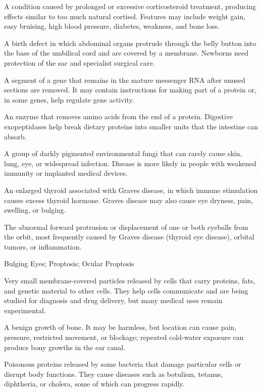  A condition caused by prolonged or excessive corticosteroid treatment, producing effects similar to too much natural cortisol. Features may include weight gain, easy bruising, high blood pressure, diabetes, weakness, and bone loss.

 A birth defect in which abdominal organs protrude through the belly button into the base of the umbilical cord and are covered by a membrane. Newborns need protection of the sac and specialist surgical care.

 A segment of a gene that remains in the mature messenger RNA after unused sections are removed. It may contain instructions for making part of a protein or, in some genes, help regulate gene activity.

 An enzyme that removes amino acids from the end of a protein. Digestive exopeptidases help break dietary proteins into smaller units that the intestine can absorb.

 A group of darkly pigmented environmental fungi that can rarely cause skin, lung, eye, or widespread infection. Disease is more likely in people with weakened immunity or implanted medical devices.

 An enlarged thyroid associated with Graves disease, in which immune stimulation causes excess thyroid hormone. Graves disease may also cause eye dryness, pain, swelling, or bulging.

 The abnormal forward protrusion or displacement of one or both eyeballs from the orbit, most frequently caused by Graves disease (thyroid eye disease), orbital tumors, or inflammation.

\synonyms
Bulging Eyes; Proptosis; Ocular Proptosis

 Very small membrane-covered particles released by cells that carry proteins, fats, and genetic material to other cells. They help cells communicate and are being studied for diagnosis and drug delivery, but many medical uses remain experimental.

 A benign growth of bone. It may be harmless, but location can cause pain, pressure, restricted movement, or blockage; repeated cold-water exposure can produce bony growths in the ear canal.

 Poisonous proteins released by some bacteria that damage particular cells or disrupt body functions. They cause diseases such as botulism, tetanus, diphtheria, or cholera, some of which can progress rapidly.

